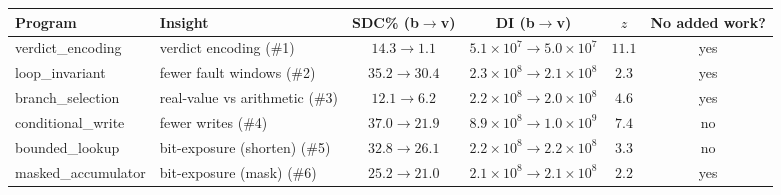 \begin{tabular}{@{}llcccc@{}}
\toprule
\textbf{Program} & \textbf{Insight} & \textbf{SDC\% (b$\to$v)} & \textbf{DI (b$\to$v)} & $z$ & \textbf{No added work?} \\
\midrule
verdict\_encoding & verdict encoding (\#1) & $14.3 \to 1.1$ & $5.1\times10^{7}{\to}5.0\times10^{7}$ & $11.1$ & yes \\
loop\_invariant & fewer fault windows (\#2) & $35.2 \to 30.4$ & $2.3\times10^{8}{\to}2.1\times10^{8}$ & $2.3$ & yes \\
branch\_selection & real-value vs arithmetic (\#3) & $12.1 \to 6.2$ & $2.2\times10^{8}{\to}2.0\times10^{8}$ & $4.6$ & yes \\
conditional\_write & fewer writes (\#4) & $37.0 \to 21.9$ & $8.9\times10^{8}{\to}1.0\times10^{9}$ & $7.4$ & no \\
bounded\_lookup & bit-exposure (shorten) (\#5) & $32.8 \to 26.1$ & $2.2\times10^{8}{\to}2.2\times10^{8}$ & $3.3$ & no \\
masked\_accumulator & bit-exposure (mask) (\#6) & $25.2 \to 21.0$ & $2.1\times10^{8}{\to}2.1\times10^{8}$ & $2.2$ & yes \\
\bottomrule
\end{tabular}
